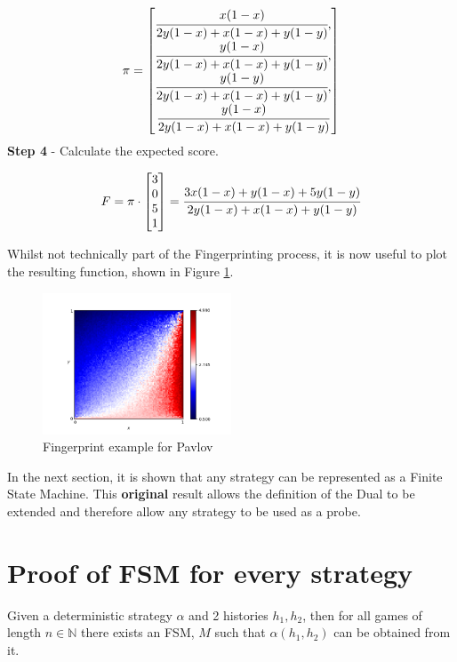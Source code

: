 \begin{equation}\label{eq:steady_state}
%
\pi =
\begin{bmatrix}
\cfrac{x (1 - x)}{2y(1-x) + x(1-x) + y(1-y)}, \\
\cfrac{y (1 - x)}{2y(1-x) + x(1-x) + y(1-y)}, \\
\cfrac{y (1 - y)}{2y(1-x) + x(1-x) + y(1-y)}, \\
\cfrac{y (1 - x)}{2y(1-x) + x(1-x) + y(1-y)}
\end{bmatrix}
\end{equation}
\textbf{Step 4} - Calculate the expected score.

\begin{equation}
F = \pi \cdot
\begin{bmatrix}
3 \\
0 \\
5 \\
1
\end{bmatrix}
=
\cfrac{3x(1-x) + y(1-x) + 5y(1-y)}{2y(1-x) + x(1-x) + y(1-y)}
\end{equation}

Whilst not technically part of the Fingerprinting process, it is now useful to plot the resulting function, shown in Figure \ref{fig:pavlov_fing_ex}.

\begin{figure}[htbp!]
\centering
\includegraphics[width = 0.5\textwidth]{../img/Numerical/Win_Stay_Lose_Shift.png}
\caption{Fingerprint example for Pavlov}
\label{fig:pavlov_fing_ex}
\end{figure}

In the next section, it is shown that any strategy can be represented as a Finite State Machine.
This \textbf{original} result allows the definition of the Dual to be extended and therefore allow any strategy to be used as a probe.



\section{Proof of FSM for every strategy}\label{sec:fsm_proof}
\begin{theorem}\label{thm:fsm}
Given a deterministic strategy $\alpha$ and 2 histories $h_1, h_2$, then for all games of length $n \in \mathbb{N}$ there exists an FSM, $M$ such that $\alpha(h_1, h_2)$ can be obtained from it.
\end{theorem}


